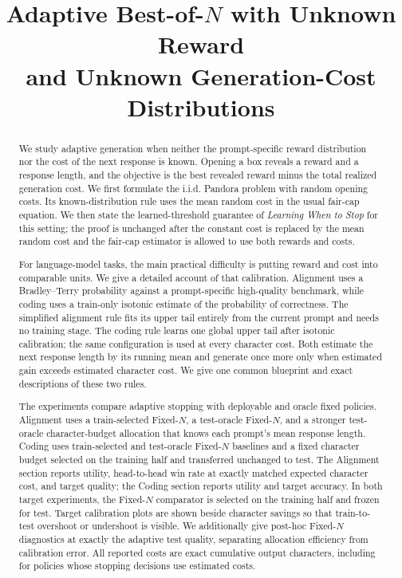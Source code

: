 \documentclass[10pt]{article}
\title{Adaptive Best-of-$N$ with Unknown Reward\\
and Unknown Generation-Cost Distributions}
\author{}
\date{}
\begin{document}
\maketitle

\begin{abstract}
We study adaptive generation when neither the prompt-specific reward
distribution nor the cost of the next response is known.  Opening a box
reveals a reward and a response length, and the objective is the best revealed
reward minus the total realized generation cost.  We first formulate the
i.i.d. Pandora problem with random opening costs.  Its known-distribution rule
uses the mean random cost in the usual fair-cap equation.  We then state the
learned-threshold guarantee of \emph{Learning When to Stop} for this setting;
the proof is unchanged after the constant cost is replaced by the mean random
cost and the fair-cap estimator is allowed to use both rewards and costs.

For language-model tasks, the main practical difficulty is putting reward and
cost into comparable units.  We give a detailed account of that calibration.
Alignment uses a Bradley--Terry probability against a prompt-specific
high-quality benchmark, while coding uses a train-only isotonic estimate of
the probability of correctness.  The simplified alignment rule fits its
upper tail entirely from the current prompt and needs no training stage.  The
coding rule learns one global upper tail after isotonic calibration; the same
configuration is used at every character cost.  Both estimate the next
response length by its running mean and generate once more only when estimated
gain exceeds estimated character cost.  We give one common blueprint and
exact descriptions of these two rules.

The experiments compare adaptive stopping with deployable and oracle fixed
policies.  Alignment uses a train-selected Fixed-$N$, a test-oracle Fixed-$N$,
and a stronger test-oracle character-budget allocation that knows each
prompt's mean response length.  Coding uses train-selected and test-oracle
Fixed-$N$ baselines and a fixed character budget selected on the training
half and transferred unchanged to test.  The Alignment section reports
utility, head-to-head win rate at exactly matched expected character cost,
and target quality; the Coding section reports utility and target accuracy.
In both target experiments, the Fixed-$N$ comparator is selected on the
training half and frozen for test.  Target calibration plots are shown beside
character savings so that train-to-test overshoot or undershoot is visible.
We additionally give post-hoc Fixed-$N$ diagnostics at exactly the adaptive
test quality, separating allocation efficiency from calibration error.  All
reported costs are exact cumulative output characters, including for policies
whose stopping decisions use estimated costs.
\end{abstract}


\end{document}
